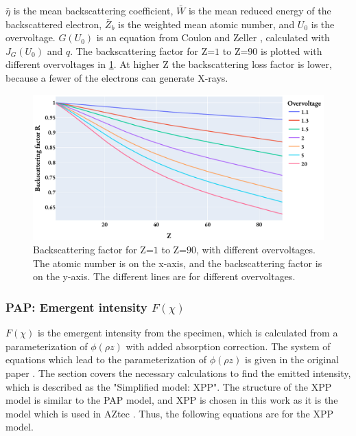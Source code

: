 $\bar{\eta}$ is the mean backscattering coefficient, $\bar{W}$ is the mean reduced energy of the backscattered electron, $\bar{Z}_b$ is the weighted mean atomic number, and $U_0$ is the overvoltage.
$G(U_0)$ is an equation from Coulon and Zeller \cite[Reference 28]{pap_1991}, calculated with $J_G(U_0)$ and $q$.
The backscattering factor for Z=$1$ to Z=$90$ is plotted with different overvoltages in \cref{fig:PAP:backscattering_factor}.
At higher Z the backscattering loss factor is lower, because a fewer of the electrons can generate X-rays.


\begin{figure}[htbp]
    \centering
    \includegraphics[width=0.8\linewidth]{figures/PAP_backscattering_factor.pdf}
    \caption{
        Backscattering factor for Z=$1$ to Z=$90$, with different overvoltages.
        The atomic number is on the x-axis, and the backscattering factor is on the y-axis.
        The different lines are for different overvoltages.
    }
    \label{fig:PAP:backscattering_factor}
\end{figure}





\subsubsection{PAP: Emergent intensity $F(\chi)$}
\label{sec:theory:quantitative:pap:emergent_intensity}

$F(\chi)$ is the emergent intensity from the specimen, which is calculated from a parameterization of $\phi(\rho z)$ with added absorption correction.
The system of equations which lead to the parameterization of $\phi(\rho z)$ is given in the original paper \cite{pap_1991}.
The section covers the necessary calculations to find the emitted intensity, which is described as the "Simplified model: XPP".
The structure of the XPP model is similar to the PAP model, and XPP is chosen in this work as it is the model which is used in AZtec \cite{oxford_blog_XPP}.
Thus, the following equations are for the XPP model.


